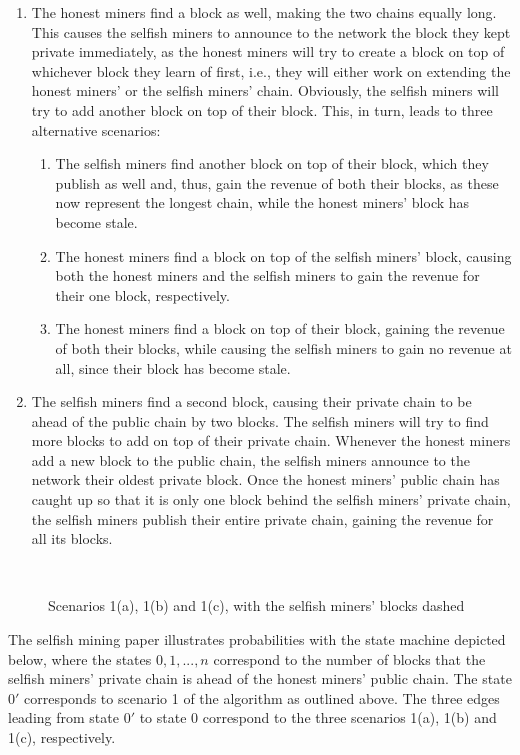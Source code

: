 \begin{enumerate}
	\item 
		The honest miners find a block as well, making the two chains equally long.
		This causes the selfish miners to announce to the network the block they kept private immediately, as the honest miners will try to create a block on top of whichever block they learn of first, i.e., they will either work on extending the honest miners’ or the selfish miners’ chain.
		Obviously, the selfish miners will try to add another block on top of their block.
		This, in turn, leads to three alternative scenarios:
		\begin{enumerate}
			\item
				The selfish miners find another block on top of their block, which they publish as well and, thus, gain the revenue of both their blocks, as these now represent the longest chain, while the honest miners' block has become stale.
			\item
				The honest miners find a block on top of the selfish miners' block, causing both the honest miners and the selfish miners to gain the revenue for their one block, respectively.
			\item
				The honest miners find a block on top of their block, gaining the revenue of both their blocks, while causing the selfish miners to gain no revenue at all, since their block has become stale.
		\end{enumerate}
	\item
		The selfish miners find a second block, causing their private chain to be ahead of the public chain by two blocks.
		The selfish miners will try to find more blocks to add on top of their private chain.
		Whenever the honest miners add a new block to the public chain, the selfish miners announce to the network their oldest private block.
		Once the honest miners’ public chain has caught up so that it is only one block behind the selfish miners' private chain, the selfish miners publish their entire private chain, gaining the revenue for all its blocks.
\end{enumerate}
\leavevmode\\
\begin{figure}[H]
	\centering
	
	\caption*{Scenarios 1(a), 1(b) and 1(c), with the selfish miners' blocks dashed}
\end{figure}

The selfish mining paper illustrates probabilities with the state machine depicted below, where the states $0, 1, ..., n$ correspond to the number of blocks that the selfish miners' private chain is ahead of the honest miners' public chain.
The state $0'$ corresponds to scenario 1 of the algorithm as outlined above.
The three edges leading from state $0'$ to state $0$ correspond to the three scenarios 1(a), 1(b) and 1(c), respectively.

